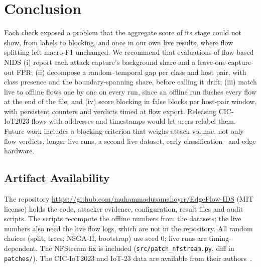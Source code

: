 \section{Conclusion}\label{sec:conclusion}

Each check exposed a problem that the aggregate score of its stage could not show, from labels to blocking, and once in our own live results, where flow splitting left macro-F1 unchanged. We recommend that evaluations of flow-based NIDS (i) report each attack capture's background share and a leave-one-capture-out FPR; (ii) decompose a random--temporal gap per class and host pair, with class presence and the boundary-spanning share, before calling it drift; (iii) match live to offline flows one by one on every run, since an offline run flushes every flow at the end of the file; and (iv) score blocking in false blocks per host-pair window, with persistent counters and verdicts timed at flow export. Releasing CIC-IoT2023 flows with addresses and timestamps would let users relabel them. Future work includes a blocking criterion that weighs attack volume, not only flow verdicts, longer live runs, a second live dataset, early classification~\cite{pekar2025early} and edge hardware.

\subsection{Artifact Availability}

The repository \url{https://github.com/muhammadusamahoyrr/EdgeFlow-IDS} (MIT license) holds the code, attacker evidence, configuration, result files and audit scripts. The scripts recompute the offline numbers from the datasets; the live numbers also need the live flow logs, which are not in the repository. All random choices (split, trees, NSGA-II, bootstrap) use seed 0; live runs are timing-dependent. The NFStream fix is included (\nolinkurl{src/patch_nfstream.py}, diff in \nolinkurl{patches/}).
The CIC-IoT2023 and IoT-23 data are available from their authors~\cite{neto2023ciciot2023,garcia2020iot23}.
